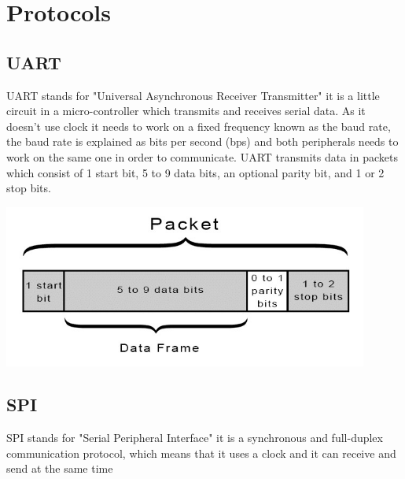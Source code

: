 \documentclass[12pt,a4paper,landscape]{article}
\begin{document}
\section*{Protocols}
	\begin{multicols}{2}
		\subsection*{UART}
		UART stands for "Universal Asynchronous Receiver Transmitter" it is a little circuit in a micro-controller which transmits and receives serial data.
		As it doesn't use clock it needs to work on a fixed frequency known as the baud rate, the baud rate is explained as bits per second (bps) and both peripherals needs to work on the same one in order to communicate.
		UART transmits data in packets which consist of 1 start bit, 5 to 9 data bits, an optional parity bit, and 1 or 2 stop bits.

		\begin{center}
			\includegraphics[width=12cm]{UART_packet.png}
		\end{center}

		\vspace{4cm}

		\subsection*{SPI}
		SPI stands for "Serial Peripheral Interface" it is a synchronous and full-duplex communication protocol, which means that it uses a clock and it can receive and send at the same time\\


\end{multicols}
\end{document}
